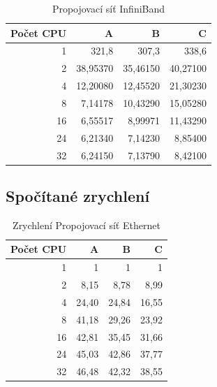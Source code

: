 \documentclass[12pt]{article}
\begin{document}
\begin{table}[H]
\begin{center}
\begin{tabular}{|r|r|r|r|}
\hline
Počet CPU & A & B & C\\
\hline
1 & 321,8 & 307,3 & 338,6\\
\hline
2 & 38,95370 & 35,46150 & 40,27100\\
\hline
4 & 12,20080 & 12,45520 & 21,30230\\
\hline
8 & 7,14178 & 10,43290 & 15,05280\\
\hline
16 & 6,55517 & 8,99971 & 11,43290\\
\hline
24 & 6,21340 & 7,14230 & 8,85400\\
\hline
32 & 6,24150 & 7,13790 & 8,42100\\
\hline
\end{tabular} 
\end{center}
\caption{Propojovací síť InfiniBand}
\end{table}

\subsection{Spočítané zrychlení}
\begin{table}[H]
\begin{center}
\begin{tabular}{|r|r|r|r|}
\hline
Počet CPU & A & B & C\\
\hline
1 & 1 & 1 & 1\\
\hline
2 & 8,15 & 8,78 & 8,99\\
\hline
4 & 24,40 & 24,84 & 16,55\\
\hline
8 & 41,18 & 29,26 & 23,92\\
\hline
16 & 42,81 & 35,45 & 31,66\\
\hline
24 & 45,03 & 42,86 & 37,77\\
\hline
32 & 46,48 & 42,32 & 38,55\\
\hline
\end{tabular}
\end{center}
\caption{Zrychlení Propojovací síť Ethernet}
\end{table}
\end{document}
